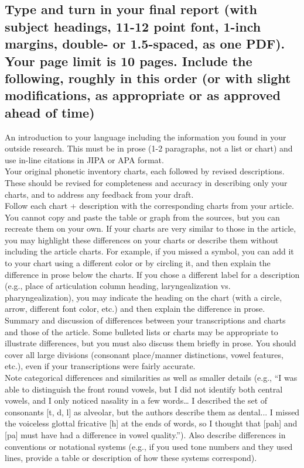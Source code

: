 \documentclass[12pt]{article}
\begin{document}
\subsection*{Type and turn in your final report (with subject headings, 11-12 point font, 1-inch margins, double- or 1.5-spaced, as one PDF). Your page limit is 10 pages.  Include the following, roughly in this order (or with slight modifications, as appropriate or as approved ahead of time)}
An introduction to your language including the information you found in your outside research.  This must be in prose (1-2 paragraphs, not a list or chart) and use in-line citations in JIPA or APA format.\\
Your original phonetic inventory charts, each followed by revised descriptions. These should be revised for completeness and accuracy in describing only your charts, and to address any feedback from your draft.\\
Follow each chart + description with the corresponding charts from your article.  You cannot copy and paste the table or graph from the sources, but you can recreate them on your own. If your charts are very similar to those in the article, you may highlight these differences on your charts or describe them without including the article charts.  For example, if you missed a symbol, you can add it to your chart using a different color or by circling it, and then explain the difference in prose below the charts. If you chose a different label for a description (e.g., place of articulation column heading, laryngealization vs. pharyngealization), you may indicate the heading on the chart (with a circle, arrow, different font color, etc.) and then explain the difference in prose.\\
Summary and discussion of differences between your transcriptions and charts and those of the article.  Some bulleted lists or charts may be appropriate to illustrate differences, but you must also discuss them briefly in prose.  You should cover all large divisions (consonant place/manner distinctions, vowel features, etc.), even if your transcriptions were fairly accurate.\\
Note categorical differences and similarities as well as smaller details (e.g., “I was able to distinguish the front round vowels, but I did not identify both central vowels, and I only noticed nasality in a few words… I described the set of consonants [t, d, l] as alveolar, but the authors describe them as dental...  I missed the voiceless glottal fricative [h] at the ends of words, so I thought that [pah] and [pa] must have had a difference in vowel quality.”).  Also describe differences in conventions or notational systems (e.g., if you used tone numbers and they used lines, provide a table or description of how these systems correspond).\\
\end{document}
